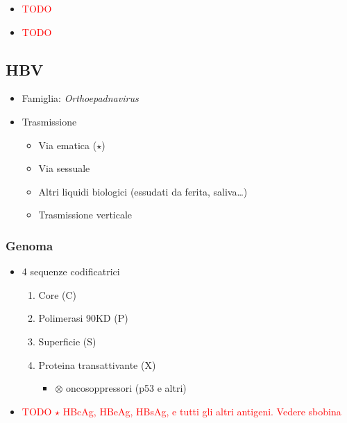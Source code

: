 \documentclass[italian,]{article}
\providecommand{\tightlist}{%
  \setlength{\itemsep}{0pt}\setlength{\parskip}{0pt}}
\newcommand{\ini}[0]{ $\otimes$ }                                       %
\newcommand{\TODO}[1]{\textcolor{red}{\textsf{\footnotesize{TODO #1}}}} %
\begin{document}
\begin{itemize}
\item
  \TODO{}
\item
  \TODO{}
\end{itemize}

\hypertarget{hbv-1}{%
\subsection{HBV}\label{hbv-1}}

\begin{itemize}
\tightlist
\item
  Famiglia: \emph{Orthoepadnavirus}
\item
  Trasmissione

  \begin{itemize}
  \tightlist
  \item
    Via ematica (\(\star\))
  \item
    Via sessuale
  \item
    Altri liquidi biologici (essudati da ferita, saliva\ldots{})
  \item
    Trasmissione verticale
  \end{itemize}
\end{itemize}

\hypertarget{genoma}{%
\subsubsection{Genoma}\label{genoma}}

\begin{itemize}
\item
  4 sequenze codificatrici

  \begin{enumerate}
  \def\labelenumi{\arabic{enumi}.}
  \tightlist
  \item
    Core (C)
  \item
    Polimerasi 90KD (P)
  \item
    Superficie (S)
  \item
    Proteina transattivante (X)

    \begin{itemize}
    \tightlist
    \item
      \ini oncosoppressori (p53 e altri)
    \end{itemize}
  \end{enumerate}
\item
  \TODO{$\star$ HBcAg, HBeAg, HBsAg, e tutti gli altri antigeni. Vedere sbobina}
\end{itemize}
\end{document}

